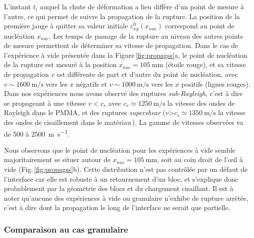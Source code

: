 L'instant $t_i$ auquel la chute de déformation a lieu diffère d'un point de mesure à l'autre, ce qui permet de suivre la propagation de la rupture. La position de la première jauge à quitter sa valeur initiale $\varepsilon_{xy}^0(x_{nuc})$ correspond au point de nucléation $x_{nuc}$. Les temps de passage de la rupture au niveau des autres points de mesure permettent de déterminer sa vitesse de propagation. Dans le cas de l'expérience à vide présentée dans la Figure\,\ref{fig:propagss}a, le point de nucléation de la rupture est mesuré à la position $x_{nuc}=\SI{105}{\milli\meter}$ (étoile rouge), et sa vitesse de propagation $v$ est différente de part et d'autre du point de nucléation, avec $v\sim\SI{1600}{\meter\per\second}$ vers les $x$ négatifs et $v\sim\SI{1000}{\meter\per\second}$ vers les $x$ positifs (lignes rouges). Dans nos expériences nous avons observé des ruptures \textit{sub-Rayleigh}, c'est à dire se propageant à une vitesse $v<c_r$ avec $c_r\simeq\SI{1250}{\meter\per\second}$ la vitesse des ondes de Rayleigh dans le PMMA, et des ruptures \textit{supershear} ($v$>$c_s\simeq\SI{1350}{\meter\per\second}$ la vitesse des ondes de cisaillement dans le matériau\,\cite{christman_dynamic_1972}). La gamme de vitesses observées va de 500 à \SI{2500}{\meter\per\second}.

Nous observons que le point de nucléation pour les expériences à vide semble majoritairement se situer autour de $x_{nuc}=\SI{105}{\milli\meter}$, soit au coin droit de l'œil à vide (Fig.\,\ref{fig:propagss}b). Cette distribution n'est pas contrôlée par un défaut de l'interface car elle est robuste à un retournement d'un bloc, et s'explique donc probablement par la géométrie des blocs et du chargement cisaillant. Il est à noter qu'aucune des expériences à vide ou granulaire n'exhibe de rupture arrêtée, c'est à dire dont la propagation le long de l'interface ne serait que partielle.


\subsubsection{Comparaison au cas granulaire}



